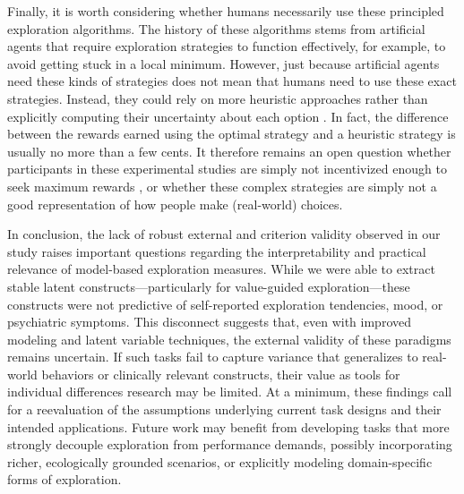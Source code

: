\documentclass[fleqn,10pt]{wlscirep}
\begin{document}
Finally, it is worth considering whether humans necessarily use these principled exploration algorithms. The history of these algorithms stems from artificial agents\cite{kaelbling1993learning,lai1985asymptotically} that require exploration strategies to function effectively, for example, to avoid getting stuck in a local minimum. However, just because artificial agents need these kinds of strategies does not mean that humans need to use these exact strategies. Instead, they could rely on more heuristic approaches rather than explicitly computing their uncertainty about each option \cite{witte2024exploring, ferguson_humans_2023, thalmann_simple_2023}. In fact, the difference between the rewards earned using the optimal strategy and a heuristic strategy is usually no more than a few cents. It therefore remains an open question whether participants in these experimental studies are simply not incentivized enough to seek maximum rewards \cite{zorowitz2023inattentive}, or whether these complex strategies are simply not a good representation of how people make (real-world) choices.

In conclusion, the lack of robust external and criterion validity observed in our study raises important questions regarding the interpretability and practical relevance of model-based exploration measures. While we were able to extract stable latent constructs—particularly for value-guided exploration—these constructs were not predictive of self-reported exploration tendencies, mood, or psychiatric symptoms. This disconnect suggests that, even with improved modeling and latent variable techniques, the external validity of these paradigms remains uncertain. If such tasks fail to capture variance that generalizes to real-world behaviors or clinically relevant constructs, their value as tools for individual differences research may be limited. At a minimum, these findings call for a reevaluation of the assumptions underlying current task designs and their intended applications. Future work may benefit from developing tasks that more strongly decouple exploration from performance demands, possibly incorporating richer, ecologically grounded scenarios, or explicitly modeling domain-specific forms of exploration.
\end{document}
